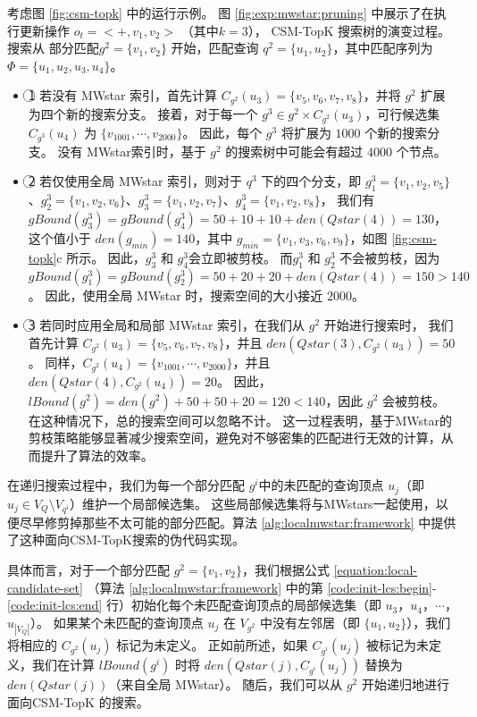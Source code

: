 考虑图 \ref{fig:csm-topk} 中的运行示例。
图 \ref{fig:exp:mwstar:pruning} 中展示了在执行更新操作 $o_t=<+,v_1,v_2>$ （其中$k=3$）， CSM-TopK 搜索树的演变过程。
搜索从 部分匹配$g^2=\{v_1, v_2\}$ 开始，匹配查询 $q^2=\{u_1, u_2\}$，其中匹配序列为 $\Phi=\{u_1, u_2, u_3, u_4\}$。
\begin{itemize}
\item
\textcircled{1} 若没有 MWstar 索引，首先计算 $C_{g^2}(u_3)=\{v_5, v_6, v_7, v_8\}$，并将 $g^2$ 扩展为四个新的搜索分支。
接着，对于每一个 $g^3 \in g^2 \times C_{g^2}(u_3)$，可行候选集 $C_{g^3}(u_4)$ 为 $\{v_{1001}, \cdots, v_{2000}\}$。
因此，每个 $g^3$ 将扩展为 $1000$ 个新的搜索分支。
没有 MWstar索引时，基于 $g^2$ 的搜索树中可能会有超过 $4000$ 个节点。
\item
\textcircled{2} 若仅使用全局 MWstar 索引，则对于 $q^3$ 下的四个分支，即 $g_1^3=\{v_1, v_2, v_5\}$、$g_2^3=\{v_1, v_2, v_6\}$、$g_3^3=\{v_1, v_2, v_7\}$、$g_4^3=\{v_1, v_2, v_8\}$，
我们有 $gBound(g_3^3)=gBound(g_4^3)=50+10+10+den(Qstar(4))=130$，这个值小于 $den(g_{min})=140$，其中 $g_{min}=\{v_1, v_3, v_6, v_9\}$，如图 \ref{fig:csm-topk}c 所示。
因此，$g_3^3$ 和 $g_4^3$会立即被剪枝。
而$g_1^3$ 和 $g_2^3$ 不会被剪枝，因为 $gBound(g_1^3) = gBound(g_2^3) = 50+20+20+den(Qstar(4)) = 150 > 140$。
因此，使用全局 MWstar 时，搜索空间的大小接近 $2000$。
\item
\textcircled{3} 若同时应用全局和局部 MWstar 索引，在我们从 $g^2$ 开始进行搜索时，
我们首先计算 $C_{g^2}(u_3)=\{v_5, v_6, v_7, v_8\}$，并且 $den(Qstar(3), C_{g^2}(u_3)) = 50$。
同样，$C_{g^2}(u_4)=\{v_{1001}, \cdots, v_{2000}\}$，并且 $den(Qstar(4), C_{g^2}(u_4)) = 20$。
因此，$lBound(g^2)=den(g^2)+50+50+20=120<140$，因此 $g^2$ 会被剪枝。
在这种情况下，总的搜索空间可以忽略不计。
这一过程表明，基于MWstar的剪枝策略能够显著减少搜索空间，避免对不够密集的匹配进行无效的计算，从而提升了算法的效率。
\end{itemize}

在递归搜索过程中，我们为每一个部分匹配 $g^i$中的未匹配的查询顶点 $u_j$（即 $u_j \in V_Q \setminus V_{q^i}$）维护一个局部候选集。
这些局部候选集将与MWstars一起使用，以便尽早修剪掉那些不太可能的部分匹配。算法 \ref{alg:localmwstar:framework} 中提供了这种面向CSM-TopK搜索的伪代码实现。

具体而言，对于一个部分匹配 $g^2 = \{v_1, v_2\}$，我们根据公式 \ref{equation:local-candidate-set} （算法 \ref{alg:localmwstar:framework} 中的第 \ref{code:init-lcs:begin}-\ref{code:init-lcs:end} 行）初始化每个未匹配查询顶点的局部候选集（即 $u_3$，$u_4$，$\cdots$，$u_{|V_Q|}$）。
如果某个未匹配的查询顶点 $u_j$ 在 $V_{g^2}$ 中没有左邻居（即 $\{u_1, u_2\}$），我们将相应的 $C_{g^2}(u_j)$ 标记为未定义。
正如前所述，如果 $C_{g^i}(u_j)$ 被标记为未定义，我们在计算 $lBound(g^i)$ 时将 $den(Qstar(j), C_{g^i}(u_j))$ 替换为 $den(Qstar(j))$（来自全局 MWstar）。
随后，我们可以从 $g^2$ 开始递归地进行 面向CSM-TopK 的搜索。

